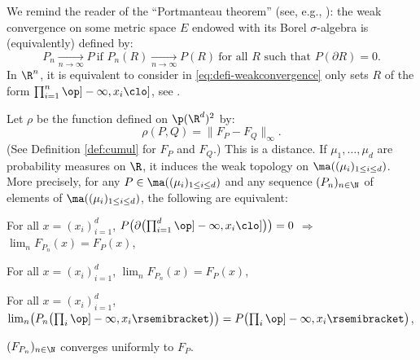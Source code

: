 \begin{reminder}\label{remind:billingsley}We remind the reader of the ``Portmanteau theorem'' (see, e.g., \cite[Th.\,2.1]{Bi}): the weak convergence on some metric space $E$ endowed with its Borel $\sigma$-algebra is (equivalently) defined by:
\begin{equation}\label{eq:defi-weakconvergence}P_n\underset{n\to\infty}{\longrightarrow}P\ \text{if }P_n(R)\underset{n\to\infty}{\longrightarrow}P(R)\ \text{for all $R$ such that }P(\partial R)=0.
\end{equation}
In $\R^n$, it is equivalent to consider in \eqref{eq:defi-weakconvergence} only sets $R$ of the form $\prod_{i=1}^n\op]-\infty,x_i\clo]$, see \cite[Exam.\,2.3 p.\,18]{Bi}.
\end{reminder}

\begin{pronotation}\label{pro:rho} Let $\rho$ be the function defined on $\p(\R^d)^2$ by:
\[\rho(P,Q)=\|F_P-F_Q\|_\infty.\]
(See Definition \ref{def:cumul} for $F_P$ and $F_Q$.) This is a distance. If $\mu_1,\ldots,\mu_d$ are probability measures on $\R$, it induces the weak topology on $\ma((\mu_i)_{1\leq i\leq d})$. More precisely, for any $P\in\ma((\mu_i)_{1\leq i\leq d})$ and any sequence $(P_n)_{n\in\N}$ of elements of $\ma((\mu_i)_{1\leq i\leq d})$, the following are equivalent:
\begin{enumeratei}
\item\label{pro:rhoi}
For all $x=(x_i)_{i=1}^d$, $P\bigl(\partial\bigl( \prod_{i=1}^d\op]-\infty,x_i\clo]\bigr)\bigr)=0$ $\Rightarrow$ $\lim_nF_{P_n}(x)=F_{P}(x)$,

\item\label{pro:rhoii}
For all $x=(x_i)_{i=1}^d$, $\lim_nF_{P_n}(x)=F_{P}(x)$,

\bgroup{}\setcounter{enumi}{1}
\item\label{pro:rhoii'}
For all $x=(x_i)_{i=1}^d$, $\lim_n\bigl(P_n\bigl(\prod_i\op]-\infty,x_i\rsemibracket\bigr)\bigr)=P\bigl(\prod_i\op]-\infty,x_i\rsemibracket\bigr)$,
\egroup

\item\label{pro:rhoiii}
$(F_{P_n})_{n\in \N}$ converges uniformly to $F_P$.
\end{enumeratei}
\end{pronotation}

